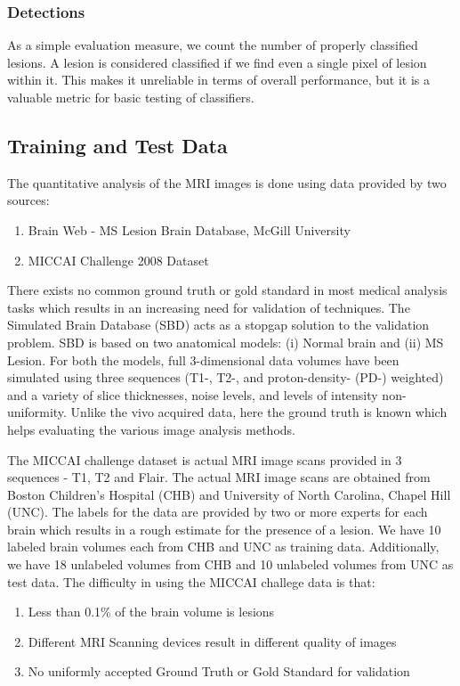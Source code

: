 \documentclass{article} %
\begin{document}
\subsubsection{Detections}

As a simple evaluation measure, we count the number of properly classified lesions. A lesion is considered classified if we find even a single pixel of lesion within it. This makes it unreliable in terms of overall performance, but it is a valuable metric for basic testing of classifiers.

\subsection{Training and Test Data}
The quantitative analysis of the MRI images is done using data provided by two sources:
\begin{enumerate}
\item Brain Web - MS Lesion Brain Database, McGill University
\item MICCAI Challenge 2008 Dataset
\end{enumerate}

There exists no common ground truth or gold standard in most medical analysis tasks which results in an increasing need for validation of techniques. The Simulated Brain Database (SBD) acts as a stopgap solution to the validation problem. SBD is based on two anatomical models: (i) Normal brain and (ii) MS Lesion.  For both the models, full 3-dimensional data volumes have been simulated using three sequences (T1-, T2-, and proton-density- (PD-) weighted) and a variety of slice thicknesses, noise levels, and levels of intensity non-uniformity.  Unlike the vivo acquired data, here the ground truth is known which helps evaluating the various image analysis methods. 

The MICCAI challenge dataset is actual MRI image scans provided in 3 sequences - T1, T2 and Flair. The actual MRI image scans are obtained from Boston Children's Hospital (CHB) and University of North Carolina, Chapel Hill (UNC). The labels for the data are provided by two or more experts for each brain which results in a rough estimate for the presence of a lesion. We have 10 labeled brain volumes each from CHB and UNC as training data. Additionally, we have 18 unlabeled volumes from CHB and 10 unlabeled volumes from UNC as test data. The difficulty in using the MICCAI challege data is that:
\begin{enumerate}
\item Less than 0.1\% of the brain volume is lesions
\item Different MRI Scanning devices result in different quality of images
\item No uniformly accepted Ground Truth or Gold Standard for validation
\end{enumerate}
\end{document}
